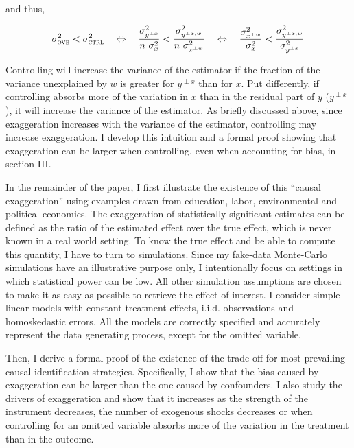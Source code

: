 			and thus,
			
			\[
				 \sigma_{\textsc{ovb}}^2 < \sigma_{\textsc{ctrl}}^2
				 	\quad \Leftrightarrow \quad 
					\dfrac{\sigma^{2}_{y^{\perp x}}}{n \ \sigma_{x}^{2}} <
				 	\dfrac{\sigma^{2}_{y^{\perp x, w}}}{n \ \sigma_{x^{\perp w}}^{2}} 
					\quad \Leftrightarrow \quad 
					\dfrac{\sigma^{2}_{x^{\perp w}}}{\sigma_{x}^{2}} <
					\dfrac{\sigma^{2}_{y^{\perp x, w}}}{ \sigma_{y^{\perp x}}^{2}}
			\]
			
			Controlling will increase the variance of the estimator if the fraction of the variance unexplained by $w$ is greater for $y^{\perp x}$ than for $x$. Put differently, if controlling absorbs more of the variation in $x$ than in the residual part of $y$ ($y^{\perp x}$), it will increase the variance of the estimator. As briefly discussed above, since exaggeration increases with the variance of the estimator, controlling may increase exaggeration. I develop this intuition and a formal proof showing that exaggeration can be larger when controlling, even when accounting for bias, in section III. %
			
			In the remainder of the paper, I first illustrate the existence of this ``causal exaggeration'' using examples drawn from education, labor, environmental and political economics. %
			The exaggeration of statistically significant estimates can be defined as the ratio of the estimated effect over the true effect, which is never known in a real world setting. To know the true effect and be able to compute this quantity, I have to turn to simulations. Since my fake-data Monte-Carlo simulations have an illustrative purpose only, I intentionally focus on settings in which statistical power can be low. All other simulation assumptions are chosen to make it as easy as possible to retrieve the effect of interest. I consider simple linear models with constant treatment effects, i.i.d. observations and homoskedastic errors. All the models are correctly specified and accurately represent the data generating process, except for the omitted variable.
						
			Then, I derive a formal proof of the existence of the trade-off for most prevailing causal identification strategies. Specifically, I show that the bias caused by exaggeration can be larger than the one caused by confounders. I also study the drivers of exaggeration and show that it increases as the strength of the instrument decreases, the number of exogenous shocks decreases or when controlling for an omitted variable absorbs more of the variation in the treatment than in the outcome. 
			
